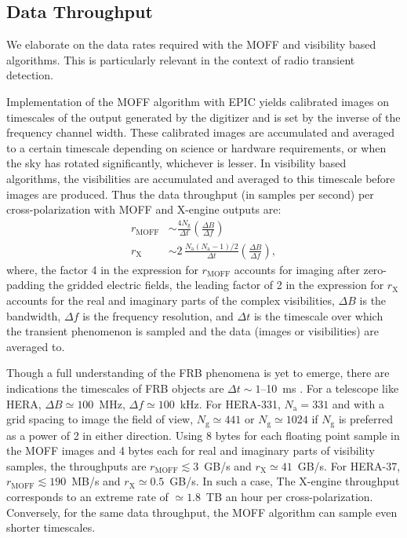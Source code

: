 \documentclass[a4paper,fleqn,usenatbib]{mnras}
\newcommand{\Nant}{N_\textrm{a}}
\newcommand{\Ngrid}{N_\textrm{g}}
\begin{document}
\subsection{Data Throughput}

We elaborate on the data rates required with the MOFF and visibility based
algorithms. This is particularly relevant in the context of radio transient 
detection. 

Implementation of the MOFF algorithm with EPIC yields calibrated images on
timescales of the output generated by the digitizer and is set by the inverse
of the frequency channel width. These calibrated images are accumulated and 
averaged to a certain timescale depending on science or hardware requirements,
or when the sky has rotated significantly, whichever is lesser. In visibility
based algorithms, the visibilities are accumulated and averaged to this 
timescale before images are produced. Thus the data throughput (in samples per 
second) per cross-polarization with MOFF and X-engine outputs are: 
\begin{align}
  r_\textrm{MOFF} &\sim \frac{4\Ngrid}{\Delta t} \left(\frac{\Delta B}{\Delta f}\right) \\
  r_\textrm{X} &\sim 2\,\frac{\Nant(\Nant-1)/2}{\Delta t} \left(\frac{\Delta B}{\Delta f}\right),
\end{align}
where, the factor 4 in the expression for $r_\textrm{MOFF}$ accounts for imaging
after zero-padding the gridded electric fields, the leading factor of 2 in the
expression for $r_\textrm{X}$ accounts for the real and imaginary parts of the
complex visibilities, $\Delta B$ is the bandwidth, $\Delta f$ is the frequency 
resolution, and $\Delta t$ is the timescale over which the transient phenomenon
is sampled and the data (images or visibilities) are averaged to.

Though a full understanding of the FRB phenomena is yet to emerge, there are 
indications the timescales of FRB objects are $\Delta t \sim 1$--10~ms 
\citep{tho13}. For a telescope like HERA, $\Delta B \simeq 100$~MHz, 
$\Delta f \simeq 100$~kHz. For HERA-331, $\Nant=331$ and with a grid 
spacing to image the field of view, $\Ngrid \simeq 441$ or 
$\Ngrid \simeq 1024$ if $\Ngrid$ is preferred as a power of 2 in either 
direction. Using 8 bytes for each floating point sample in the MOFF images and 
4 bytes each for real and imaginary parts of visibility samples, the throughputs 
are $r_\textrm{MOFF} \lesssim 3$~GB/s and $r_\textrm{X} \simeq 41$~GB/s. For 
HERA-37, $r_\textrm{MOFF} \lesssim 190$~MB/s and $r_\textrm{X} \simeq 0.5$~GB/s. 
In such a case, The X-engine throughput corresponds to an extreme rate of 
$\simeq 1.8$~TB an hour per cross-polarization. Conversely, for the same data 
throughput, the MOFF algorithm can sample even shorter timescales. 
\end{document}
